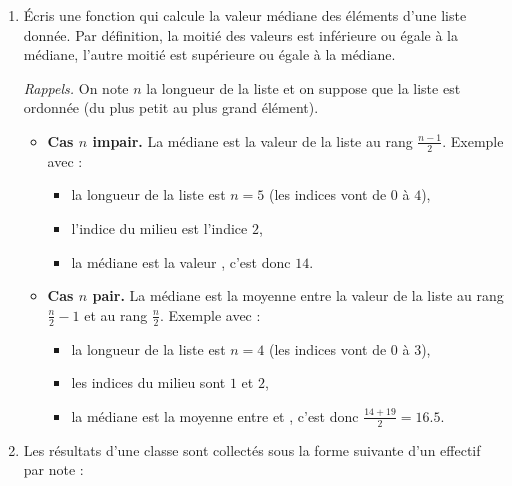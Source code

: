\documentclass[11pt,class=report,crop=false]{standalone}
\begin{document}
\begin{activite}





\begin{enumerate}
  \item Écris une fonction  qui calcule la valeur médiane des éléments d'une liste donnée. Par définition, la moitié des valeurs est inférieure ou égale à la médiane, l'autre moitié est supérieure ou égale à la médiane.

  \emph{Rappels.} On note $n$ la longueur de la liste et on suppose que la liste est ordonnée (du plus petit au plus grand élément).
  \begin{itemize}
    \item \textbf{Cas $n$ impair.} La médiane est la valeur de la liste au rang $\frac{n-1}{2}$.    
    Exemple avec  :
    \begin{itemize}
      \item la longueur de la liste est $n=5$ (les indices vont de $0$ à $4$),
      \item l'indice du milieu est l'indice $2$,
      \item la médiane est la valeur , c'est donc $14$.
    \end{itemize}
    
    \item \textbf{Cas $n$ pair.} La médiane est la moyenne entre la valeur de la liste au rang $\frac{n}{2}-1$ et au rang $\frac{n}{2}$.
    Exemple avec  :
    \begin{itemize}
      \item la longueur de la liste est $n=4$ (les indices vont de $0$ à $3$),
      \item les indices du milieu sont $1$ et $2$,
      \item la médiane est la moyenne entre  et , c'est donc $\frac{14+19}{2} = 16.5$.
    \end{itemize}    
   \end{itemize} 
   
   
   
     
    \item Les résultats d'une classe sont collectés sous la forme suivante d'un effectif par note : 
    

\end{enumerate}
\end{activite}
\end{document}
